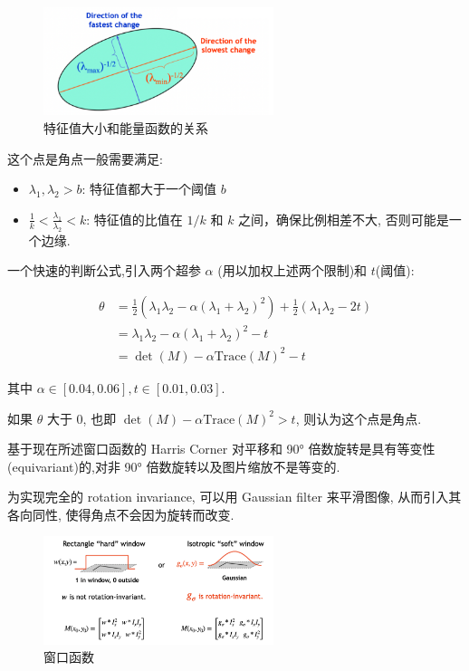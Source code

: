 \newpage

\begin{figure}[htbp]
    \centering
    \includegraphics[width=0.6\textwidth]{figures/corner_energy.png}
    \caption{特征值大小和能量函数的关系}
\end{figure}

\begin{proposition}

这个点是角点一般需要满足:

\begin{itemize}
    \item $\lambda_1, \lambda_2>b$: 特征值都大于一个阈值 $b$
    \item $\frac{1}{k}<\frac{\lambda_1}{\lambda_2}<k$: 特征值的比值在 $1/k$ 和 $k$ 之间，确保比例相差不大, 否则可能是一个边缘.
\end{itemize}

一个快速的判断公式,引入两个超参 $\alpha$ (用以加权上述两个限制)和 $t$(阈值):

\begin{equation}
\begin{aligned}
\theta&=\frac 12(\lambda_1\lambda_2-\alpha(\lambda_1+\lambda_2)^2)+\frac12(\lambda_1\lambda_2-2t)\\
&=\lambda_1\lambda_2-\alpha(\lambda_1+\lambda_2)^2-t\\
&=\det(M)-\alpha\text{Trace}(M)^2-t
\end{aligned}
\end{equation}

其中 $\alpha\in[0.04,0.06], t\in[0.01,0.03]$.

如果 $\theta$ 大于 0, 也即 $\det(M)-\alpha\text{Trace}(M)^2>t$, 则认为这个点是角点.
\end{proposition}

\begin{note}
基于现在所述窗口函数的 Harris Corner 对平移和 90° 倍数旋转是具有等变性(equivariant)的,对非 90° 倍数旋转以及图片缩放不是等变的.

为实现完全的 rotation invariance, 可以用 Gaussian filter 来平滑图像, 从而引入其各向同性, 使得角点不会因为旋转而改变.

\begin{figure}[htbp]
    \centering
    \includegraphics[width=0.6\textwidth]{figures/window-function.png}
    \caption{窗口函数}
\end{figure}


\end{note}
